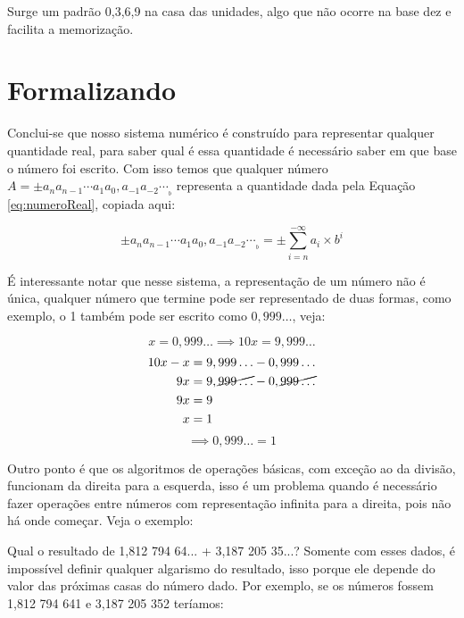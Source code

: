 \documentclass{report}
\theoremstyle{definition}
\begin{document}
Surge um padrão 0,3,6,9 na casa das unidades, algo que não ocorre na base dez e facilita a memorização.

\section{Formalizando}

Conclui-se que nosso sistema numérico é construído para representar qualquer quantidade real, para saber qual é essa quantidade é necessário saber em que base o número foi escrito. Com isso temos que qualquer número $A = \pm a_n a_{n-1} \cdots a_1 a_0 , a_{-1} a_{-2} \cdots _{_b}$ representa a quantidade dada pela Equação \ref{eq:numeroReal}, copiada aqui:

\begin{equation}\label{eq:numeroReal2}
    \pm a_n a_{n-1} \cdots a_1 a_0 , a_{-1} a_{-2} \cdots _{_b} = \pm \sum_{i=n}^{-\infty}a_i \times b^i
\end{equation}

É interessante notar que nesse sistema, a representação de um número não é única, qualquer número que termine pode ser representado de duas formas, como exemplo, o 1 também pode ser escrito como $0,999\ldots$, veja:

\begin{equation*}
    x=0,999\ldots \implies 10x=9,999\ldots
\end{equation*}
\begin{align*}
    10x - x & = 9,999 \ldots - 0,999 \ldots                 \\
    9x & = 9,\cancel{999 \ldots} - 0,\cancel{999 \ldots}    \\
    9x & = 9                                                \\
    x & = 1
\end{align*}
\begin{equation*}
\implies 0,999\ldots = 1
\end{equation*}

Outro ponto é que os algoritmos de operações básicas, com exceção ao da divisão, funcionam da direita para a esquerda, isso é um problema quando é necessário fazer operações entre números com representação infinita para a direita, pois não há onde começar. Veja o exemplo:

Qual o resultado de 1,812 794 64... + 3,187 205 35...? Somente com esses dados, é impossível definir qualquer algarismo do resultado, isso porque ele depende do valor das próximas casas do número dado. Por exemplo, se os números fossem 1,812 794 641 e 3,187 205 352 teríamos:
\end{document}
